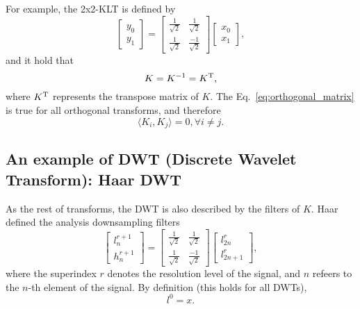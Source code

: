 For example, the 2x2-KLT is defined by
\begin{equation}
  \begin{bmatrix}
    y_0 \\
    y_1
  \end{bmatrix}
  = 
  \begin{bmatrix} \frac{1}{\sqrt{2}} & \frac{1}{\sqrt{2}} \\ \frac{1}{\sqrt{2}} & \frac{-1}{\sqrt{2}} \end{bmatrix}
  \begin{bmatrix}
    x_0 \\
    x_1
  \end{bmatrix},
  \label{eq:KLT_transform}
\end{equation}
and it hold that
\begin{equation}
  K=K^{-1}=K^{\text T},
  \label{eq:orthogonal_matrix}
\end{equation}
where $K^{\text T}$ represents the transpose matrix of $K$. The
Eq.~\ref{eq:orthogonal_matrix} is true for all orthogonal transforms,
and therefore
\begin{equation}
  \langle K_i, K_j\rangle = 0, \forall i\neq j.
\end{equation}

\subsection{An example of DWT (Discrete Wavelet Transform): Haar DWT}

As the rest of transforms, the DWT is also described by the filters of
$K$. Haar defined the analysis downsampling filters
\begin{equation}
  \begin{bmatrix}
    l^{r+1}_n \\
    h^{r+1}_n
  \end{bmatrix}
  = 
  \begin{bmatrix} \frac{1}{\sqrt{2}} & \frac{1}{\sqrt{2}} \\ \frac{1}{\sqrt{2}} & \frac{-1}{\sqrt{2}} \end{bmatrix}
  \begin{bmatrix}
    l^r_{2n} \\
    l^r_{2n+1}
  \end{bmatrix},
  \label{eq:Haar_transform}
\end{equation}
where the superindex $r$ denotes the resolution level of the signal, and $n$ refeers to the $n$-th element of the signal. By definition (this holds for all DWTs),
\begin{equation}
  l^0=x.
\end{equation}

